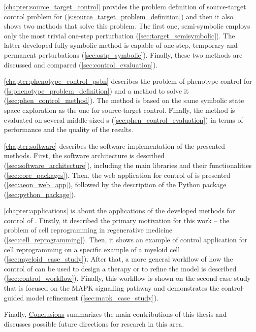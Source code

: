 \autoref{chapter:source_target_control} provides the problem definition of source-target control problem for \PBN{} (\autoref{s:source_target_problem_definition}) and then it also shows two methods that solve this problem. The first one, semi-symbolic employs only the most trivial one-step perturbation (\autoref{sec:target_semisymbolic}). The latter developed fully symbolic method is capable of one-step, temporary and permanent perturbations (\autoref{sec:ostp_symbolic}). Finally, these two methods are discussed and compared (\autoref{sec:control_evaluation}).

\autoref{chapter:phenotype_control_psbn} describes the problem of phenotype control for \PBN{} (\autoref{s:phenotype_problem_definition}) and a method to solve it (\autoref{sec:phen_control_method}). The method is based on the same symbolic state space exploration as the one for source-target control. Finally, the method is evaluated on several middle-sized \PBN{}s (\autoref{sec:phen_control_evaluation}) in terms of performance and the quality of the results. 

\autoref{chapter:software} describes the software implementation of the presented methods. First, the software architecture is described (\autoref{sec:software_architecture}), including the main libraries and their functionalities (\autoref{sec:core_packages}). Then, the web application for control of \PBN{} is presented (\autoref{sec:aeon_web_app}), followed by the description of the Python package (\autoref{sec:python_package}).

\autoref{chapter:applications} is about the applications of the developed methods for control of \PBN{}. Firstly, it described the primary motivation for this work -- the problem of cell reprogramming in regenerative medicine (\autoref{sec:cell_reprogramming}). Then, it shows an example of \PBN{} control application for cell reprogramming on a specific example of a myeloid cell (\autoref{sec:myeloid_case_study}). After that, a more general workflow of how the control of \PBN{} can be used to design a therapy or to refine the model is described (\autoref{sec:control_workflow}). Finally, this workflow is shown on the second case study that is focused on the MAPK signalling pathway and demonstrates the control-guided model refinement (\autoref{sec:mapk_case_study}).

Finally, \hyperref[chapter:conclusion]{Conclusions} summarizes the main contributions of this thesis and discusses possible future directions for research in this area.